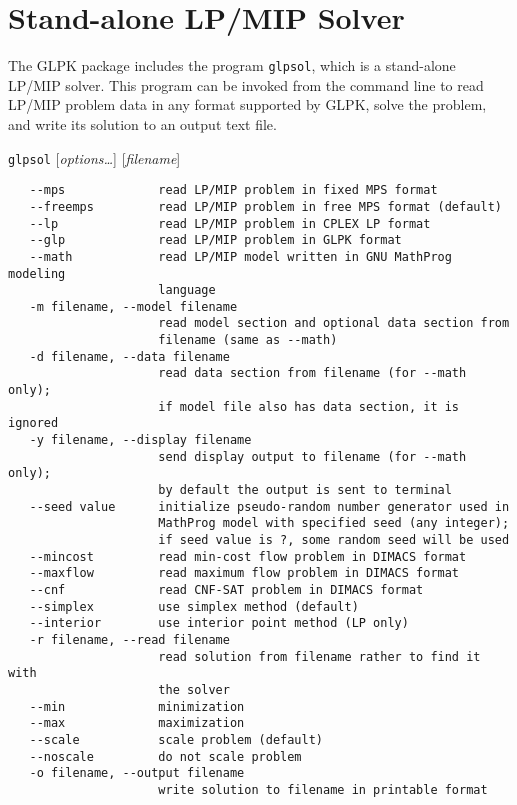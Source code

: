 
\chapter{Stand-alone LP/MIP Solver}
\label{chaglpsol}

The GLPK package includes the program \verb|glpsol|, which is a
stand-alone LP/MIP solver. This program can be invoked from the command
line to read LP/MIP problem data in any format supported by GLPK, solve
the problem, and write its solution to an output text file.


\verb|glpsol| [{\it options\dots}] [{\it filename}]


\begin{verbatim}
   --mps             read LP/MIP problem in fixed MPS format
   --freemps         read LP/MIP problem in free MPS format (default)
   --lp              read LP/MIP problem in CPLEX LP format
   --glp             read LP/MIP problem in GLPK format
   --math            read LP/MIP model written in GNU MathProg modeling
                     language
   -m filename, --model filename
                     read model section and optional data section from
                     filename (same as --math)
   -d filename, --data filename
                     read data section from filename (for --math only);
                     if model file also has data section, it is ignored
   -y filename, --display filename
                     send display output to filename (for --math only);
                     by default the output is sent to terminal
   --seed value      initialize pseudo-random number generator used in
                     MathProg model with specified seed (any integer);
                     if seed value is ?, some random seed will be used
   --mincost         read min-cost flow problem in DIMACS format
   --maxflow         read maximum flow problem in DIMACS format
   --cnf             read CNF-SAT problem in DIMACS format
   --simplex         use simplex method (default)
   --interior        use interior point method (LP only)
   -r filename, --read filename
                     read solution from filename rather to find it with
                     the solver
   --min             minimization
   --max             maximization
   --scale           scale problem (default)
   --noscale         do not scale problem
   -o filename, --output filename
                     write solution to filename in printable format

\end{verbatim}
